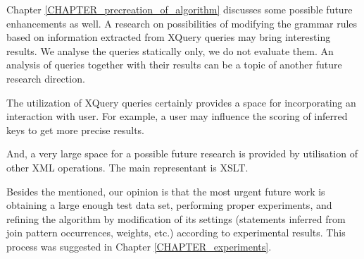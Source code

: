 Chapter \ref{CHAPTER_precreation_of_algorithm} discusses some possible future enhancements as well. A research on possibilities of modifying the grammar rules based on information extracted from XQuery queries may bring interesting results. We analyse the queries statically only, we do not evaluate them. An analysis of queries together with their results can be a topic of another future research direction.

The utilization of XQuery queries certainly provides a space for incorporating an interaction with user. For example, a user may influence the scoring of inferred keys to get more precise results.

And, a very large space for a possible future research is provided by utilisation of other XML operations. The main representant is XSLT.

Besides the mentioned, our opinion is that the most urgent future work is obtaining a large enough test data set, performing proper experiments, and refining the algorithm by modification of its settings (statements inferred from join pattern occurrences, weights, etc.) according to experimental results. This process was suggested in Chapter \ref{CHAPTER_experiments}.